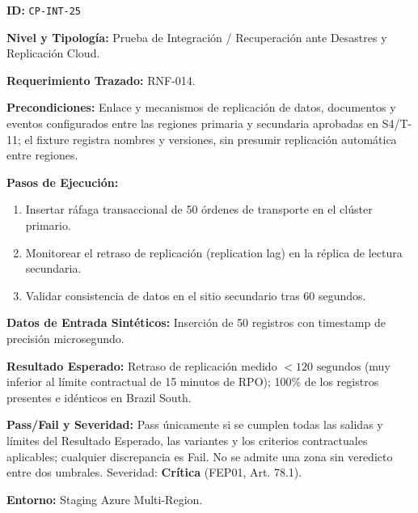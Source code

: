 \par\noindent \textbf{ID:} \texttt{CP-\allowbreak{}INT-\allowbreak{}25}\par
\par\noindent \textbf{Nivel y Tipología:} Prueba de Integración / Recuperación ante Desastres y Replicación Cloud.\par
\par\noindent \textbf{Requerimiento Trazado:} RNF-014.\par
\par\noindent \textbf{Precondiciones:} Enlace y mecanismos de replicación de datos, documentos y eventos configurados entre las regiones primaria y secundaria aprobadas en S4/T-11; el fixture registra nombres y versiones, sin presumir replicación automática entre regiones.\par
\par\noindent \textbf{Pasos de Ejecución:}\par
\begin{enumerate}
\item Insertar ráfaga transaccional de 50 órdenes de transporte en el clúster primario.
\item Monitorear el retraso de replicación (replication lag) en la réplica de lectura secundaria.
\item Validar consistencia de datos en el sitio secundario tras 60 segundos.
\end{enumerate}

\par\noindent \textbf{Datos de Entrada Sintéticos:} Inserción de 50 registros con timestamp de precisión microsegundo.\par
\par\noindent \textbf{Resultado Esperado:} Retraso de replicación medido $< 120\text{ segundos}$ (muy inferior al límite contractual de 15 minutos de RPO); 100\% de los registros presentes e idénticos en Brazil South.\par
\par\noindent \textbf{Pass/Fail y Severidad:} Pass únicamente si se cumplen todas las salidas y límites del Resultado Esperado, las variantes y los criterios contractuales aplicables; cualquier discrepancia es Fail. No se admite una zona sin veredicto entre dos umbrales. Severidad: \textbf{Crítica} (FEP01, Art. 78.1).\par
\par\noindent \textbf{Entorno:} Staging Azure Multi-Region.\par


